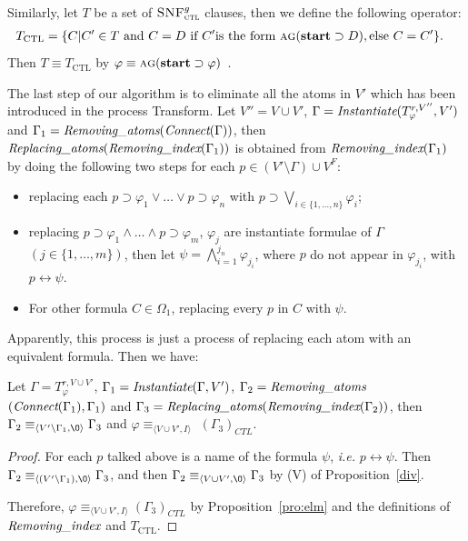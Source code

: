 \documentclass[runningheads]{llncs}
\newcommand{\tuple}[1]{{\langle{#1}\rangle}}
\newcommand\ie{{\it i.e. }}
\newcommand{\lrto}{\leftrightarrow}
\newcommand{\start}{\textbf{start}}
\newcommand{\CTL}{\textrm{CTL}}
\newcommand{\NI}{\textrm{NI}}
\newcommand{\ALL}{\textsc{a}}
\newcommand{\GLOBAL}{\textsc{g}}
\newcommand{\CTLsnf}{{\textsc{SNF}_{\textsc{ctl}}^g}}
\begin{document}
Similarly, let $T$ be a set of $\CTLsnf$ clauses, then we define the following operator:
\begin{align*}
&T_{\CTL} = \{C|C'\in T\ \mbox{and}\ C = D \ \mbox{if}\ C' \mbox{is the form}\ \ALL\GLOBAL(\start\supset D), \mbox{else}\ C= C'\}.
\end{align*}
Then $T \equiv T_{\CTL}$ by $\varphi \equiv \ALL \GLOBAL (\start \supset \varphi)$~\cite{bolotov2000clausal}.


The last step of our algorithm is to eliminate all the atoms in $V'$ which has been introduced in the process Transform. Let $V''=V \cup V'$, $\Gamma=\emph{Instantiate}(T_{\varphi}^{r, V''}, V')$ and $\Gamma_1=\emph{Removing\_atoms} (\emph{Connect}(\Gamma))$, then $\emph{Replacing\_atoms}(\emph{Removing\_index}(\Gamma_1))$ is obtained from $\emph{Removing\_index}(\Gamma_1)$ by doing the following two steps for each $p\in (V'\setminus \Gamma) \cup V^F$:
\begin{itemize}
  \item replacing each $p\supset \varphi_1\vee \dots \vee p \supset \varphi_n$ with $p \supset \bigvee_{i\in \{1,\dots, n\}} \varphi_i$;
  \item replacing $p\supset \varphi_{1}\wedge \dots \wedge p \supset \varphi_{m}$, $\varphi_j$ are instantiate formulae of  $\Gamma$ $(j \in \{1,\dots, m\})$, then let $\psi=\bigwedge_{i=1}^{j_n} \varphi_{j_i}$, where $p$ do not appear in $\varphi_{j_i}$, with $p \lrto \psi$.
  \item For other formula $C\in \Omega_1$, replacing every $p$ in $C$ with $\psi$.
\end{itemize}
Apparently, this process is just a process of replacing each atom with an equivalent formula. Then we have:
\begin{proposition}
Let $\Gamma=T_{\varphi}^{r,V \cup V'}$, $\Gamma_1=\emph{Instantiate}(\Gamma, V')$, $\Gamma_2 =\emph{Removing\_atoms}$ $(\emph{Connect}(\Gamma_1), \Gamma_1)$ and $\Gamma_3 = \emph{Replacing\_atoms}(\emph{Removing\_index}(\Gamma_2))$, then $\Gamma_2  \equiv_{\tuple{V'\setminus \Gamma_1, {\O}}} \Gamma_3$ and $\varphi \equiv_{\tuple{V\cup V',{I}}}$ $(\Gamma_3)_{CTL}$.
\end{proposition}
\begin{proof}
For each $p$ talked above is a name of the formula $\psi$, \ie $p \lrto \psi$.
Then $\Gamma_2  \equiv_{\tuple{(V'\setminus \Gamma_1), {\O}}} \Gamma_3$, and then $\Gamma_2 \equiv_{\tuple{V\cup V', {\O}}} \Gamma_3$  by (V) of Proposition~\ref{div}.

Therefore, $\varphi \equiv_{\tuple{V\cup V',{I}}} (\Gamma_3)_{CTL}$ by Proposition~\ref{pro:elm} and the definitions of $\emph{Removing\_index}$ and $T_{\CTL}$.
\end{proof}
\end{document}
